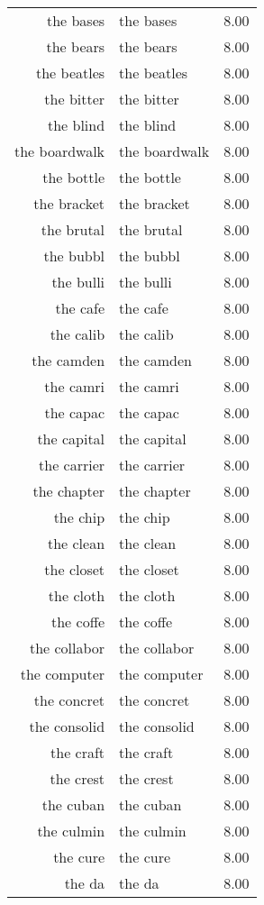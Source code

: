 \begin{table}[ht]
\begin{tabular}{rlr}
  the bases & the bases & 8.00 \\ 
  the bears & the bears & 8.00 \\ 
  the beatles & the beatles & 8.00 \\ 
  the bitter & the bitter & 8.00 \\ 
  the blind & the blind & 8.00 \\ 
  the boardwalk & the boardwalk & 8.00 \\ 
  the bottle & the bottle & 8.00 \\ 
  the bracket & the bracket & 8.00 \\ 
  the brutal & the brutal & 8.00 \\ 
  the bubbl & the bubbl & 8.00 \\ 
  the bulli & the bulli & 8.00 \\ 
  the cafe & the cafe & 8.00 \\ 
  the calib & the calib & 8.00 \\ 
  the camden & the camden & 8.00 \\ 
  the camri & the camri & 8.00 \\ 
  the capac & the capac & 8.00 \\ 
  the capital & the capital & 8.00 \\ 
  the carrier & the carrier & 8.00 \\ 
  the chapter & the chapter & 8.00 \\ 
  the chip & the chip & 8.00 \\ 
  the clean & the clean & 8.00 \\ 
  the closet & the closet & 8.00 \\ 
  the cloth & the cloth & 8.00 \\ 
  the coffe & the coffe & 8.00 \\ 
  the collabor & the collabor & 8.00 \\ 
  the computer & the computer & 8.00 \\ 
  the concret & the concret & 8.00 \\ 
  the consolid & the consolid & 8.00 \\ 
  the craft & the craft & 8.00 \\ 
  the crest & the crest & 8.00 \\ 
  the cuban & the cuban & 8.00 \\ 
  the culmin & the culmin & 8.00 \\ 
  the cure & the cure & 8.00 \\ 
  the da & the da & 8.00 \\ 

\end{tabular}
\end{table}
